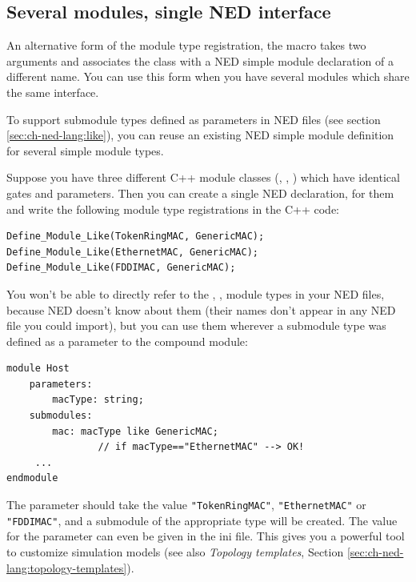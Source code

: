 \subsection{Several modules, single NED interface}

An alternative form of the module type registration, the 
macro takes two arguments and associates the class with a NED simple module
declaration of a different name. You can use this form when you have several
modules which share the same interface.

To support submodule types defined as parameters in
NED files (see section \ref{sec:ch-ned-lang:like}),
you can reuse an existing NED simple module definition
for several simple module types.

Suppose you have three different C++ module classes (,
, ) which have identical gates and parameters.
Then you can create a single NED declaration,  for them
and write the following module type registrations in the C++ code:

\begin{verbatim}
Define_Module_Like(TokenRingMAC, GenericMAC);
Define_Module_Like(EthernetMAC, GenericMAC);
Define_Module_Like(FDDIMAC, GenericMAC);
\end{verbatim}

You won't be able to directly refer to the ,
,  module types in your NED files,
because NED doesn't know about them (their names don't appear
in any NED file you could import), but you can use them wherever
a submodule type was defined as a parameter to the compound module:

\begin{verbatim}
module Host
    parameters:
        macType: string;
    submodules:
        mac: macType like GenericMAC;
                // if macType=="EthernetMAC" --> OK!
     ...
endmodule
\end{verbatim}

\begin{sloppypar}
The  parameter should take the value \texttt{"TokenRingMAC"},
\texttt{"EthernetMAC"} or \texttt{"FDDIMAC"}, and a submodule of the appropriate
type will be created. The value for the parameter can even be given in
the ini file. This gives you a powerful tool to customize simulation
models (see also \textit{Topology templates}, Section
\ref{sec:ch-ned-lang:topology-templates}).
\end{sloppypar}




